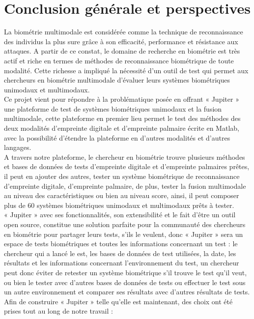 \chapter*{Conclusion générale et perspectives}
\tab La biométrie multimodale est considérée comme la technique de reconnaissance des individus la plus sure grâce à son efficacité, performance et résistance aux attaques. A partir de ce constat, le domaine de recherche en biométrie est très actif et riche en termes de méthodes de reconnaissance biométrique de toute modalité. Cette richesse a impliqué la nécessité d’un outil de test qui permet aux chercheurs en biométrie multimodale d’évaluer leurs systèmes biométriques unimodaux et multimodaux. \\ \tab
Ce projet vient pour répondre à la problématique posée en offrant « Jupiter » une plateforme de test de systèmes biométriques unimodaux et la fusion multimodale, cette plateforme en premier lieu permet le test des méthodes des deux modalités d’empreinte digitale et d’empreinte palmaire écrite en Matlab, avec la possibilité d’étendre la plateforme en d’autres modalités et d’autres langages. \\ \tab
A travers notre plateforme, le chercheur en biométrie trouve plusieurs méthodes et bases de données de tests d’empreinte digitale et d’empreinte palmaires prêtes, il peut en ajouter des autres, tester un système biométrique de reconnaissance d’empreinte digitale, d’empreinte palmaire, de plus, tester la fusion multimodale au niveau des caractéristiques ou bien au niveau score, ainsi, il peut composer plus de 60 systèmes biométriques unimodaux et multimodaux prêts à tester. \\ \tab
« Jupiter » avec ses fonctionnalités, son extensibilité et le fait d’être un outil open source, constitue une solution parfaite pour la communauté des chercheurs en biométrie pour partager leurs tests, s’ils le veulent, donc « Jupiter » sera un espace de tests biométriques et toutes les informations concernant un test : le chercheur qui a lancé le est, les bases de données de test utilisées, la date, les résultats et les informations concernant l’environnement du test, un chercheur peut donc éviter de retester un système biométrique s’il trouve le test qu’il veut, ou bien le tester avec d’autres bases de données de tests ou effectuer le test sous un autre environnement et comparer ses résultats avec d’autres résultats de tests. \\ \tab
Afin de construire « Jupiter » telle qu’elle est maintenant, des choix ont été prises tout au long de notre travail :

